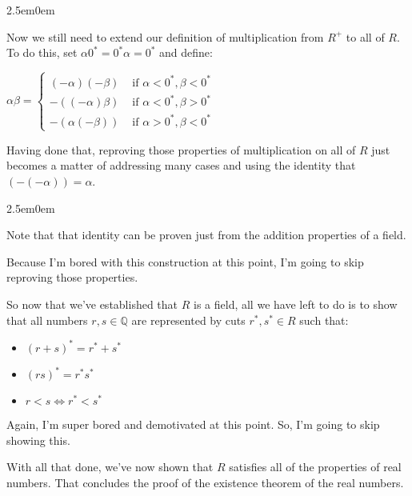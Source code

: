 \documentclass{book}
\newcommand{\myComment}{%
   \color{RawerSienna}%
   \fontsize{12}{14}\selectfont%
}
\newenvironment{myIndent}{%
   \begin{adjustwidth}{2.5em}{0em}%
}{%
   \end{adjustwidth}%
}
\newcommand{\retTwo}{\hfill\bigbreak}
\begin{document}
   \begin{myIndent}

      Now we still need to extend our definition of multiplication from $R^+$ to all of $R$. To do this, set $\alpha 0^* = 0^*\alpha = 0^*$ and define:

      {\centering $\alpha \beta = \left\{
      \begin{matrix}
         (-\alpha)(-\beta) & \text{ if } \alpha < 0^*, \beta < 0^* \\
         -((-\alpha)\beta) & \text { if } \alpha < 0^*, \beta > 0^* \\
         -(\alpha(-\beta)) & \text{ if } \alpha > 0^*, \beta < 0^*
      \end{matrix}\right.$ \retTwo\par}

      Having done that, reproving those properties of multiplication on all of $R$ just\\ becomes a matter of addressing many cases and using the identity that\\ $(-(-\alpha)) = \alpha$.

      \begin{myIndent}\myComment
         Note that that identity can be proven just from the addition properties of a field.\retTwo
      \end{myIndent}

      Because I'm bored with this construction at this point, I'm going to skip reproving those properties.\retTwo

      So now that we've established that $R$ is a field, all we have left to do is to show that all numbers $r, s \in \mathbb{Q}$ are represented by cuts $r^*, s^* \in R$ such that:
      
      \begin{itemize}
         \item $(r + s)^* = r^* + s^*$
         \item $(rs)^* = r^*s^*$
         \item $r < s \Longleftrightarrow r^* < s^*$\retTwo
      \end{itemize}

      Again, I'm super bored and demotivated at this point. So, I'm going to skip showing this.\retTwo

      With all that done, we've now shown that $R$ satisfies all of the properties of real numbers. That concludes the proof of the existence theorem of the real numbers.
      \newpage
   \end{myIndent}
\end{document}
